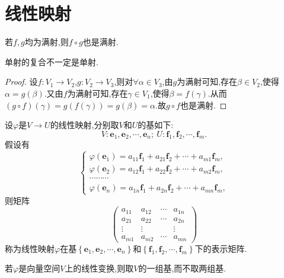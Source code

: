 \documentclass[lang=cn,newtx,10pt,scheme=chinese]{elegantbook}
\begin{document}
\chapter{线性映射}

\begin{proposition}[满射的复合仍是满射]\label{proposition:满射的复合仍是满射}
若\(f,g\)均为满射,则\(f\circ g\)也是满射.
\end{proposition}
\begin{remark}
单射的复合不一定是单射.
\end{remark}
\begin{proof}
设\(f:V_1\rightarrow V_2\),\(g:V_2\rightarrow V_3\),则对\(\forall \alpha \in V_3\),由\(g\)为满射可知,存在\(\beta \in V_2\),使得\(\alpha = g(\beta)\).又由\(f\)为满射可知,存在\(\gamma \in V_1\),使得\(\beta = f(\gamma)\).从而\((g\circ f)(\gamma)=g(f(\gamma)) = g(\beta)=\alpha\).故\(g\circ f\)也是满射.
\end{proof}

\begin{definition}[线性映射的表示矩阵]\label{definition:线性映射的表示矩阵}
设\(\varphi\)是\(V\to U\)的线性映射,分别取\(V\)和\(U\)的基如下:
\[
V:\boldsymbol{e}_1,\boldsymbol{e}_2,\cdots,\boldsymbol{e}_n; \ U:\boldsymbol{f}_1,\boldsymbol{f}_2,\cdots,\boldsymbol{f}_m.
\]
假设有
\[
\begin{cases}
\varphi(\boldsymbol{e}_1)=a_{11}\boldsymbol{f}_1 + a_{21}\boldsymbol{f}_2+\cdots + a_{m1}\boldsymbol{f}_m,\\
\varphi(\boldsymbol{e}_2)=a_{12}\boldsymbol{f}_1 + a_{22}\boldsymbol{f}_2+\cdots + a_{m2}\boldsymbol{f}_m,\\
\cdots\cdots\cdots\\
\varphi(\boldsymbol{e}_n)=a_{1n}\boldsymbol{f}_1 + a_{2n}\boldsymbol{f}_2+\cdots + a_{mn}\boldsymbol{f}_m,
\end{cases}
\]
则矩阵
\[
\begin{pmatrix}
a_{11}&a_{12}&\cdots&a_{1n}\\
a_{21}&a_{22}&\cdots&a_{2n}\\
\vdots&\vdots&&\vdots\\
a_{m1}&a_{m2}&\cdots&a_{mn}
\end{pmatrix}
\]
称为线性映射\(\varphi\)在基$\left\{ \boldsymbol{e}_1,\boldsymbol{e}_2,\cdots ,\boldsymbol{e}_n \right\}$和$\left\{ \boldsymbol{f}_1,\boldsymbol{f}_2,\cdots ,\boldsymbol{f}_m \right\}$下的表示矩阵.
\end{definition}
\begin{remark}
若\(\varphi\)是向量空间\(V\)上的线性变换,则取\(V\)的一组基,而不取两组基.
\end{remark}
\end{document}
